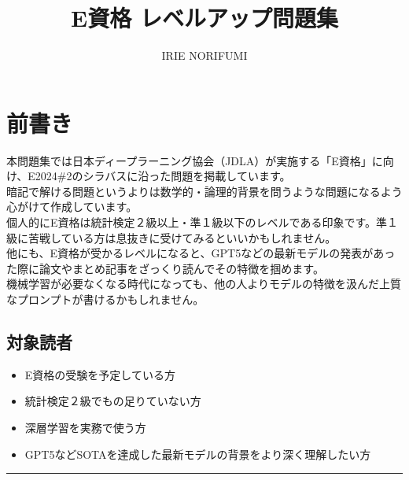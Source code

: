 \documentclass[
  letterpaper,
  DIV=11,
  numbers=noendperiod]{scrreprt}
\title{E資格 レベルアップ問題集}
\author{IRIE NORIFUMI}
\date{}
\providecommand{\tightlist}{%
  \setlength{\itemsep}{0pt}\setlength{\parskip}{0pt}}
\renewcommand*\contentsname{Table of contents}
\newcommand\contentsname{Table of contents}
\begin{document}
\maketitle

\renewcommand*\contentsname{Table of contents}
{
\hypersetup{linkcolor=}
\setcounter{tocdepth}{2}
\tableofcontents
}


\chapter*{前書き}\label{ux524dux66f8ux304d}


本問題集では日本ディープラーニング協会（JDLA）が実施する「E資格」に向け、E2024\#2のシラバスに沿った問題を掲載しています。\\
暗記で解ける問題というよりは数学的・論理的背景を問うような問題になるよう心がけて作成しています。\\
個人的にE資格は統計検定２級以上・準１級以下のレベルである印象です。準１級に苦戦している方は息抜きに受けてみるといいかもしれません。\\
他にも、E資格が受かるレベルになると、GPT5などの最新モデルの発表があった際に論文やまとめ記事をざっくり読んでその特徴を掴めます。\\
機械学習が必要なくなる時代になっても、他の人よりモデルの特徴を汲んだ上質なプロンプトが書けるかもしれません。

\section*{対象読者}\label{ux5bfeux8c61ux8aadux8005}


\begin{itemize}
\tightlist
\item
  E資格の受験を予定している方
\item
  統計検定２級でもの足りていない方
\item
  深層学習を実務で使う方
\item
  GPT5などSOTAを達成した最新モデルの背景をより深く理解したい方
\end{itemize}

\begin{center}\rule{0.5\linewidth}{0.5pt}\end{center}
\end{document}
